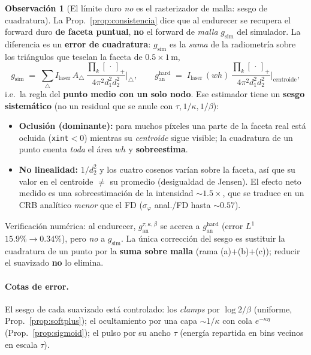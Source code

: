 \documentclass[11pt,a4paper]{article}
\theoremstyle{plain}
\theoremstyle{definition}
\newtheorem{remark}{Observaci\'on}
\begin{document}
\begin{remark}[El l\'imite duro \emph{no} es el rasterizador de malla: sesgo de cuadratura]
\label{rem:cuadratura}
La Prop.~\ref{prop:consistencia} dice que al endurecer se recupera el forward duro
\textbf{de faceta puntual}, \textbf{no} el forward de \emph{malla}
$g_{\mathrm{sim}}$ del simulador. La diferencia es un \textbf{error de cuadratura}:
$g_{\mathrm{sim}}$ es la \emph{suma} de la radiometr\'ia sobre los tri\'angulos que
teselan la faceta de $0.5\times1$\,m,
\[
    g_{\mathrm{sim}}\;=\;\sum_{\triangle} I_{\mathrm{laser}}\,A_\triangle\,
    \frac{\prod_k[\,\cdot\,]_+}{4\pi^2 d_{1}^2 d_{2}^2}\Big|_{\triangle},
    \qquad
    g^{\mathrm{hard}}_{\mathrm{an}}\;=\;I_{\mathrm{laser}}\,(w h)\,
    \frac{\prod_k[\,\cdot\,]_+}{4\pi^2 d_1^2 d_2^2}\Big|_{\text{centroide}},
\]
i.e.\ la regla del \textbf{punto medio con un solo nodo}. Ese estimador tiene un
\textbf{sesgo sistem\'atico} (no un residual que se anule con $\tau,1/\kappa,1/\beta$):
\begin{itemize}[nosep]
    \item \textbf{Oclusi\'on (dominante):} para muchos p\'ixeles una parte de la
    faceta real est\'a ocluida (\texttt{xint}$<0$) mientras su \emph{centroide}
    sigue visible; la cuadratura de un punto cuenta \emph{toda} el \'area $w h$ y
    \textbf{sobreestima}.
    \item \textbf{No linealidad:} $1/d_2^2$ y los cuatro cosenos var\'ian sobre la
    faceta, as\'i que su valor en el centroide $\neq$ su promedio (desigualdad de
    Jensen). El efecto neto medido es una sobreestimaci\'on de la intensidad
    $\sim1.5\times$, que se traduce en un CRB anal\'itico \emph{menor} que el FD
    ($\sigma_\varphi$ anal./FD hasta $\sim0.57$).
\end{itemize}
Verificaci\'on num\'erica: al endurecer, $g^{\tau,\kappa,\beta}_{\mathrm{an}}$ se
acerca a $g^{\mathrm{hard}}_{\mathrm{an}}$ (error $L^1$ $15.9\%\to0.34\%$), pero
\emph{no} a $g_{\mathrm{sim}}$. La \'unica correcci\'on del sesgo es sustituir la
cuadratura de un punto por la \textbf{suma sobre malla} (rama (a)+(b)+(c)); reducir
el suavizado \textbf{no} lo elimina.
\end{remark}

\paragraph{Cotas de error.} El sesgo de cada suavizado est\'a controlado: los
\emph{clamps} por $\log2/\beta$ (uniforme, Prop.~\ref{prop:softplus}); el
ocultamiento por una capa $\sim1/\kappa$ con cola $e^{-\kappa\eta}$
(Prop.~\ref{prop:sigmoid}); el pulso por su ancho $\tau$ (energ\'ia repartida en
bins vecinos en escala $\tau$).
\end{document}
